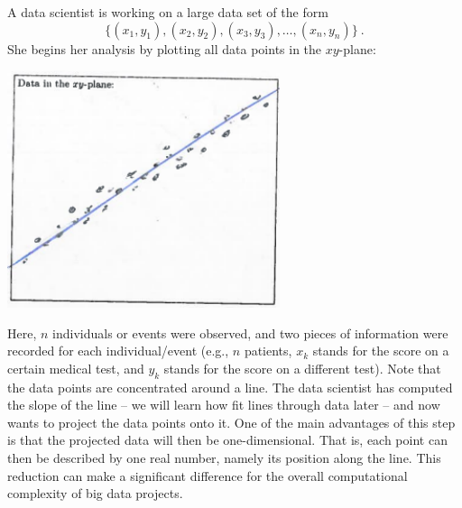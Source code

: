 \begin{application}
	A data scientist is working on a large data set of the form
	\[\{(x_1,y_1), (x_2,y_2), (x_3,y_3), \dots, (x_n,y_n)\} \:. \]
	She begins her analysis by plotting all data points in the $xy$-plane:
	\begin{center}
		\includegraphics[width=0.6\textwidth]{./Figures/f201.png}
	\end{center}
	Here, $n$ individuals or events were observed, and two pieces of information were recorded for each individual/event (e.g., $n$ patients, $x_k$ stands for the score on a certain medical test, and $y_k$ stands for the score on a different test). Note that the data points are concentrated around a line. The data scientist has computed the slope of the line -- we will learn how fit lines through data later -- and now wants to project the data points onto it. One of the main advantages of this step is that the projected data will then be one-dimensional. That is, each point can then be described by one real number, namely its position along the line. This reduction can make a significant difference for the overall computational complexity of big data projects.
	

\end{application}
